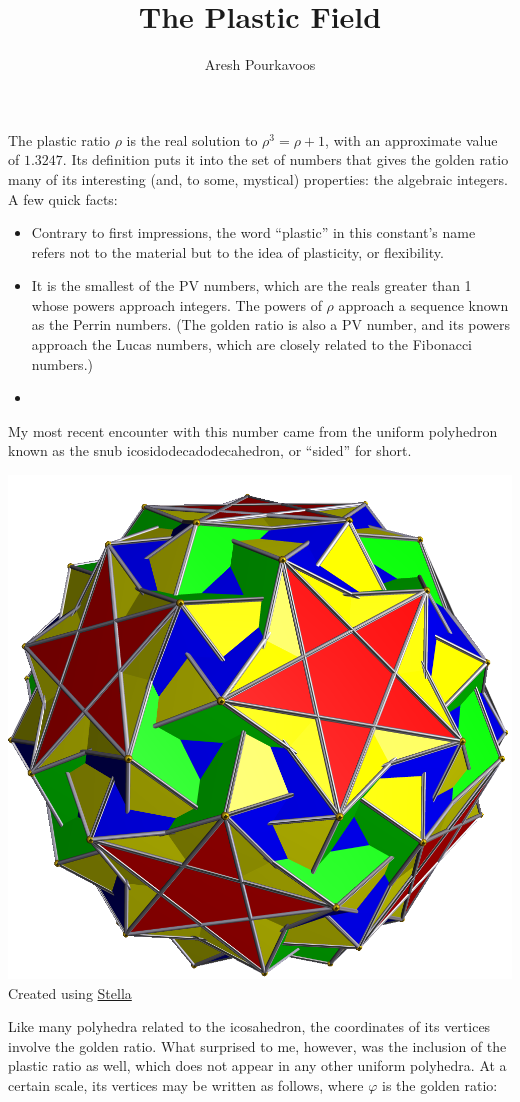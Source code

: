 \documentclass{article}
\begin{document}
\title{The Plastic Field}
\author{Aresh Pourkavoos}
\maketitle

The plastic ratio $\rho$ is the real solution to $\rho^3 = \rho+1$,
with an approximate value of $1.3247$.
Its definition puts it into the set of numbers
that gives the golden ratio many of its interesting
(and, to some, mystical) properties: the algebraic integers.
A few quick facts:
\begin{itemize}
\item
  Contrary to first impressions,
  the word ``plastic'' in this constant's name
  refers not to the material but to the idea of plasticity, or flexibility.
\item
  It is the smallest of the PV numbers,
  which are the reals greater than 1
  whose powers approach integers.
  The powers of $\rho$ approach a sequence known as the Perrin numbers.
  (The golden ratio is also a PV number,
  and its powers approach the Lucas numbers,
  which are closely related to the Fibonacci numbers.)
\item
  
\end{itemize}

My most recent encounter with this number
came from the uniform polyhedron known as
the snub icosidodecadodecahedron, or ``sided'' for short.

\begin{center}
  \includegraphics[width=0.25\linewidth]{sided.png} \\
  Created using \href{http://www.software3d.com/Stella.php}{Stella}
\end{center}

Like many polyhedra related to the icosahedron,
the coordinates of its vertices involve the golden ratio.
What surprised to me, however,
was the inclusion of the plastic ratio as well,
which does not appear in any other uniform polyhedra.
At a certain scale, its vertices may be written as follows,
where $\varphi$ is the golden ratio:
\end{document}
